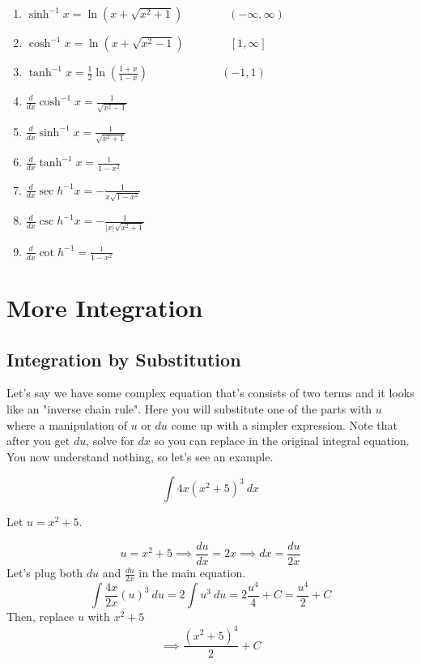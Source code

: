 \documentclass{article}
\begin{document}
\begin{enumerate}[1.]
		\item $ \sinh^{-1}x = \ln(x+ \sqrt{ x^2 +1}) \qquad \qquad (- \infty , \infty )$
		\item $ \cosh^{-1}x = \ln(x+ \sqrt{x^2-1}) \qquad \qquad [1, \infty]$ 
		\item $ \tanh^{-1}x = \frac{1}{2} \ln( \frac{ 1+x }{ 1-x }   ) \qquad \qquad \qquad \ \  (-1,1)$ 


		\item $ \frac{d}{dx} \cosh^{-1}x = \frac{1}{\sqrt{x^2-1}}$ 
		\item $ \frac{d}{dx} \sinh^{-1}x = \frac{1}{ \sqrt{ x^2+1 } } $ 
		\item $ \frac{d}{dx} \tanh^{-1}x = \frac{1}{1-x^2} $ 
		\item $ \frac{d}{dx} \sec h^{-1}x = -\frac{1}{x \sqrt{ 1-x^2 }} $
		\item $ \frac{d}{dx} \csc h^{-1}x = -\frac{1}{|x| \sqrt{ x^2+1 }} $
		\item $ \frac{d}{dx} \cot h^{-1} = \frac{1}{1-x^2}$

\end{enumerate}
\newpage


\section{More Integration}

\subsection{Integration by Substitution}

Let's say we have some complex equation that's consists of two terms and it looks like an "inverse chain rule". Here you will substitute one of the parts with $ u $ where a manipulation of $ u $ or $ du $ come up with a simpler expression. Note that after you get $ du $, solve for $ dx $ so you can replace in the original integral equation. You now understand nothing, so let's see an example.

\[
	\int 4x (x^2+5)^3 \ dx 
\]

Let $u=x^2+5$.

\[
	u = x^2+5 \implies \frac{du}{dx} = 2x \implies dx = \frac{du}{2x}
\]
Let's plug both $du$ and $ \frac{du}{2x} $ in the main equation.
\[
	\int \frac{4x}{2x} (u)^3 \ du = 2\int u^3\ du = 2 \frac{u^4}{4} + C = \frac{u^4}{2} + C
\]
Then, replace $u$ with $x^2+5$
\[
	\implies \frac{ (x^2+5)^4 }{ 2 }  + C
\]
\end{document}
